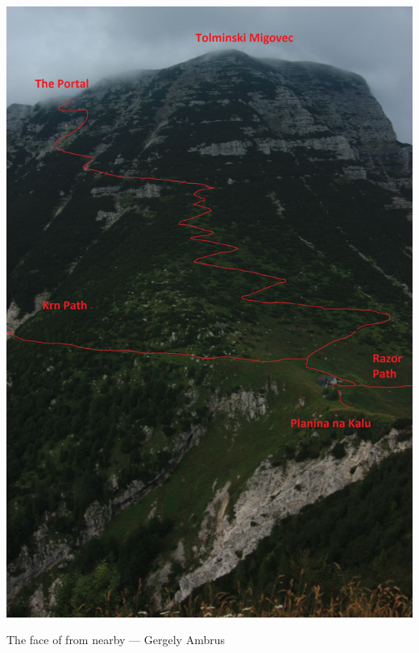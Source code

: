 \begin{pagefigure}
\includegraphics[width=\linewidth, trim ={0 0 0 200pt},clip]{images/2013/welcome-2013/gergely_mig-path.jpg} \caption{The face of \protect{} from nearby \protect{}--- Gergely Ambrus}
\end{pagefigure}
